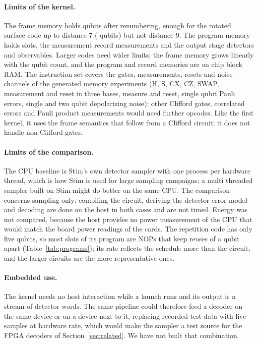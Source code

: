 \paragraph{Limits of the kernel.} The frame memory holds \NumQubitsMax{} qubits after renumbering, enough for the
rotated surface code up to distance 7 (\NumSlotsSevenQubits{} qubits) but not distance 9. The program memory holds
\NumProgMax{} slots, the measurement record \NumMeasMax{} measurements and the output stage \NumOutMax{} detectors and
observables. Larger codes need wider limits; the frame memory grows linearly with the qubit count, and the program
and record memories are on chip block RAM. The instruction set covers the gates, measurements, resets and noise channels
of the generated memory experiments (H, S, CX, CZ, SWAP, measurement and reset in three bases, measure and reset,
single qubit Pauli errors, single and two qubit depolarizing noise); other Clifford gates, correlated errors and
Pauli product measurements would need further opcodes. Like the first kernel, it uses the frame semantics that
follow from a Clifford circuit; it does not handle non Clifford gates.

\paragraph{Limits of the comparison.} The CPU baseline is Stim's own detector sampler with one process per hardware
thread, which is how Stim is used for large sampling campaigns; a multi threaded sampler built on Stim might do better
on the same CPU. The comparison concerns sampling only: compiling the circuit, deriving the detector error model and
decoding are done on the host in both cases and are not timed. Energy was not compared, because the host provides no
power measurement of the CPU that would match the board power readings of the cards. The repetition code has only five qubits, so
most slots of its program are NOPs that keep reuses of a qubit apart (Table~\ref{tab:programs}); its rate reflects
the schedule more than the circuit, and the larger circuits are the more representative ones.

\paragraph{Embedded use.} The kernel needs no host interaction while a launch runs and its output is a stream of
detector words. The same pipeline could therefore feed a decoder on the same device or on a device next to it,
replacing recorded test data with live samples at hardware rate, which would make the sampler a test source for the
FPGA decoders of Section~\ref{sec:related}. We have not built that combination.
